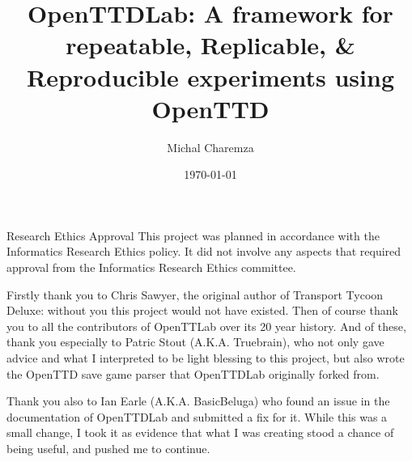 \documentclass[logo,msc,dsti]{infthesis}    %
\begin{document}
\begin{preliminary}

\title{OpenTTDLab: A framework for repeatable, Replicable, \& Reproducible experiments using OpenTTD}

\author{Michal Charemza}

\date{\today}


\maketitle

\newenvironment{ethics}
   {\begin{frontenv}{Research Ethics Approval}{\LARGE}}
   {\end{frontenv}\newpage}

\begin{ethics}
This project was planned in accordance with the Informatics Research
Ethics policy. It did not involve any aspects that required approval
from the Informatics Research Ethics committee.

\standarddeclaration
\end{ethics}


\begin{acknowledgements}

Firstly thank you to Chris Sawyer, the original author of Transport Tycoon Deluxe: without you this project would not have existed. Then of course thank you to all the contributors of OpenTTLab over its 20 year history. And of these, thank you especially to Patric Stout (A.K.A. Truebrain), who not only gave advice and what I interpreted to be light blessing to this project, but also wrote the OpenTTD save game parser that OpenTTDLab originally forked from.

Thank you also to Ian Earle (A.K.A. BasicBeluga) who found an issue in the documentation of OpenTTDLab and submitted a fix for it. While this was a small change, I took it as evidence that what I was creating stood a chance of being useful, and pushed me to continue.


\end{acknowledgements}
\end{preliminary}
\end{document}
